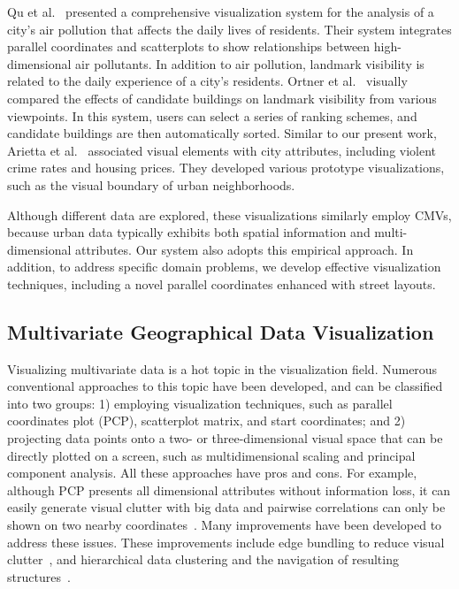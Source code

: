 Qu et al.~\cite{qu_2007_visual} presented a comprehensive visualization system for the analysis of a city's air pollution that affects the daily lives of residents.
Their system integrates parallel coordinates and scatterplots to show relationships between high-dimensional air pollutants.
In addition to air pollution, landmark visibility is related to the daily experience of a city's residents.
Ortner et al.~\cite{ortner_2016_vis-a-ware} visually compared the effects of candidate buildings on landmark visibility from various viewpoints.
In this system, users can select a series of ranking schemes, and candidate buildings are then automatically sorted.
Similar to our present work, Arietta et al.~\cite{arietta_2014_city} associated visual elements with city attributes, including violent crime rates and housing prices.
They developed various prototype visualizations, such as the visual boundary of urban neighborhoods.

Although different data are explored, these visualizations similarly employ CMVs, because urban data typically exhibits both spatial information and multi-dimensional attributes.
Our system also adopts this empirical approach.
In addition, to address specific domain problems, we develop effective visualization techniques, including a novel parallel coordinates enhanced with street layouts.

\subsection{Multivariate Geographical Data Visualization}
Visualizing multivariate data is a hot topic in the visualization field.
Numerous conventional approaches to this topic have been developed, and can be classified into two groups:
1) employing visualization techniques, such as parallel coordinates plot (PCP), scatterplot matrix, and start coordinates;
and 2) projecting data points onto a two- or three-dimensional visual space that can be directly plotted on a screen, such as multidimensional scaling and principal component analysis.
All these approaches have pros and cons.
For example, although PCP presents all dimensional attributes without information loss, it can easily generate visual clutter with big data and pairwise correlations can only be shown on two nearby coordinates~\cite{heinrich_2012_state}.
Many improvements have been developed to address these issues.
These improvements include edge bundling to reduce visual clutter~\cite{zhou2008visual, holten_2010_evaluation}, and hierarchical data clustering and the navigation of resulting structures~\cite{fua1999hierarchical, zhao_2012_structure}.

